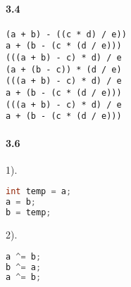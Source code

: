 \documentclass[UTF8]{ctexart}
\begin{document}
\paragraph{3.4}
\begin{lstlisting}
(a + b) - ((c * d) / e))
a + (b - (c * (d / e)))
(((a + b) - c) * d) / e
(a + (b - c)) * (d / e)
(((a + b) - c) * d) / e
a + (b - (c * (d / e)))
(((a + b) - c) * d) / e
a + (b - (c * (d / e)))

\end{lstlisting}

\paragraph{3.6\\}
1).
\begin{lstlisting}[language=C]
int temp = a;
a = b;
b = temp;

\end{lstlisting}
2).
\begin{lstlisting}[language=C]
a ^= b;
b ^= a;
a ^= b;

\end{lstlisting}
\end{document}
